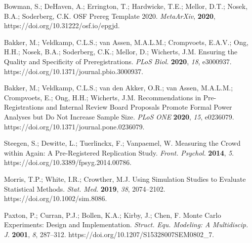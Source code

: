 \documentclass[psych,tutorial,accept,moreauthors,pdftex]{Definitions/mdpi}
\begin{document}
\begin{thebibliography}{999}
Bowman, S.; DeHaven, A.; Errington, T.; Hardwicke, T.E.; Mellor, D.T.; Nosek, B.A.; Soderberg, C.K. OSF Prereg Template 2020. \emph{MetaArXiv}, \textbf{2020}, https://doi.org/10.31222/osf.io/epgjd.


Bakker, M.; Veldkamp, C.L.S.; van Assen, M.A.L.M.; Crompvoets, E.A.V.; Ong, H.H.; Nosek, B.A.; Soderberg, C.K.; Mellor, D.; Wicherts, J.M. Ensuring the Quality and Specificity of Preregistrations. \emph{PLoS Biol.} \textbf{2020}, \emph{18}, e3000937. https://doi.org/10.1371/journal.pbio.3000937.


Bakker, M.; Veldkamp, C.L.S.; van den Akker, O.R.; van Assen, M.A.L.M.; Crompvoets, E.; Ong, H.H.; Wicherts, J.M. Recommendations in Pre-Registrations and Internal Review Board Proposals Promote Formal Power Analyses but Do Not Increase Sample Size. \emph{PLoS ONE} \textbf{2020}, \emph{15}, e0236079. https://doi.org/10.1371/journal.pone.0236079.


Steegen, S.; Dewitte, L.; Tuerlinckx, F.; Vanpaemel, W. Measuring the Crowd within Again: A Pre-Registered Replication Study. \emph{Front. Psychol.} \textbf{2014}, \emph{5}. https://doi.org/10.3389/fpsyg.2014.00786.


Morris, T.P.; White, I.R.; Crowther, M.J. Using Simulation Studies to Evaluate Statistical Methods. \emph{Stat. Med.} \textbf{2019}, \emph{38}, 2074--2102. https://doi.org/10.1002/sim.8086.


Paxton, P.; Curran, P.J.; Bollen, K.A.; Kirby, J.; Chen, F. Monte Carlo Experiments: Design and Implementation. \emph{Struct. Equ. Modeling: A Multidiscip. J.} \textbf{2001}, \emph{8}, 287--312. https://doi.org/10.1207/S15328007SEM0802\_7.



\end{thebibliography}
\end{document}
